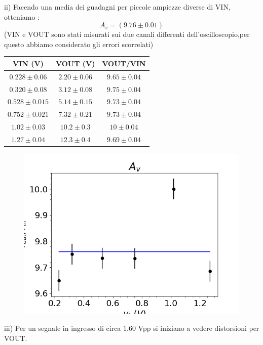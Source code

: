 \documentclass[10pt,a4paper]{article}
\begin{document}
ii)  Facendo una media dei guadagni per piccole  ampiezze diverse di VIN, otteniamo :\[A_v= (9.76\pm0.01) \]
  (VIN e VOUT sono stati misurati sui due canali differenti dell'oscilloscopio,per questo abbiamo considerato gli errori scorrelati)
\begin{table}[h]
	\centering
	\begin{tabular}{|c|c|c|}
		\hline 
		 VIN (\si{\volt}) &  VOUT (\si{\volt})   & VOUT/VIN\\
		\hline 
	$0.228 \pm  0.06 $& $2.20\pm 0.06$& $9.65 \pm 0.04$\\
	$0.320\pm 0.08 $& $3.12 \pm 0.08$& $9.75 \pm0.04$\\
	$0.528\pm 0.015 $& $5.14 \pm 0.15$& $9.73\pm 0.04$ \\
	$0.752\pm 0.021$& $7.32\pm 0.21$ & $9.73\pm 0.04$\\
	$1.02\pm 0.03 $& $10.2\pm 0.3$& $10\pm 0.04 $\\
	$1.27\pm 0.04$ & $12.3\pm 0.4 $& $9.69\pm 0.04 $\\

		\hline 
	\end{tabular} 
\end{table}

\begin{figure}[h]
	\centering
	\includegraphics[scale=0.4]{guadagno.png}

	
	
\end{figure}

iii) Per un segnale in ingresso di circa $1.60$ \si{\volt}pp si iniziano a vedere distorsioni per VOUT.
\end{document}
